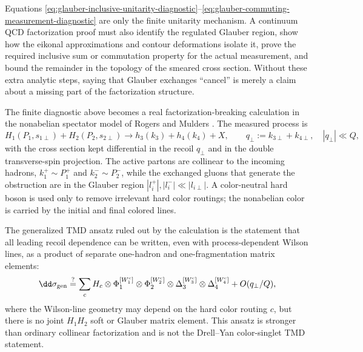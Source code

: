 Equations
\eqref{eq:glauber-inclusive-unitarity-diagnostic}--\eqref{eq:glauber-commuting-measurement-diagnostic}
are only the finite unitarity mechanism.  A continuum QCD factorization proof
must also identify the regulated Glauber region, show how the eikonal
approximations and contour deformations isolate it, prove the required
inclusive sum or commutation property for the actual measurement, and bound
the remainder in the topology of the smeared cross section.  Without these
extra analytic steps, saying that Glauber exchanges ``cancel'' is merely a
claim about a missing part of the factorization structure.

\begin{controlledapproximation}
\label{ca:scet-spectator-tmd-color-entanglement}
The finite diagnostic above becomes a real factorization-breaking calculation
in the nonabelian spectator model of Rogers and Mulders
\cite{RogersMulders2010NoGeneralizedTMD}.  The measured process is
\[
  H_1(P_1,s_{1\perp})+H_2(P_2,s_{2\perp})
  \longrightarrow
  h_3(k_3)+h_4(k_4)+X ,
  \qquad
  q_\perp:=k_{3\perp}+k_{4\perp},\quad |q_\perp|\ll Q ,
\]
with the cross section kept differential in the recoil \(q_\perp\) and in
the double transverse-spin projection.  The active partons are collinear to
the incoming hadrons, \(k_1^+\sim P_1^+\) and \(k_2^-\sim P_2^-\), while the
exchanged gluons that generate the obstruction are in the Glauber region
\(|l_i^+|,|l_i^-|\ll |l_{i\perp}|\).  A color-neutral hard boson is used only
to remove irrelevant hard color routings; the nonabelian color is carried by
the initial and final colored lines.

The generalized TMD ansatz ruled out by the calculation is the statement that
all leading recoil dependence can be written, even with process-dependent
Wilson lines, as a product of separate one-hadron and one-fragmentation
matrix elements:
\begin{equation}
  \dd\sigma_{\rm gen}
  \stackrel{?}{=}
  \sum_c
  H_c
  \otimes
  \Phi_{1}^{[W_1^c]}
  \otimes
  \Phi_{2}^{[W_2^c]}
  \otimes
  \Delta_{3}^{[W_3^c]}
  \otimes
  \Delta_{4}^{[W_4^c]}
  +
  O(q_\perp/Q),
  \label{eq:scet-generalized-tmd-ansatz}
\end{equation}
where the Wilson-line geometry may depend on the hard color routing \(c\), but
there is no joint \(H_1H_2\) soft or Glauber matrix element.  This ansatz is
stronger than ordinary collinear factorization and is not the Drell--Yan
color-singlet TMD statement.


\end{controlledapproximation}
